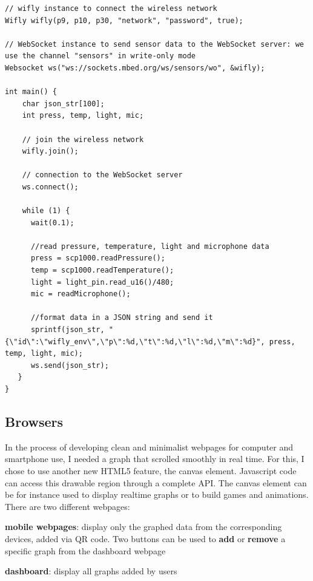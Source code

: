\documentclass[pdftex,10pt,a4paper]{report}
\newenvironment{packed_item}{
\begin{itemize}
  \setlength{\itemsep}{1pt}
  \setlength{\parskip}{0pt}
  \setlength{\parsep}{0pt}
}{\end{itemize}}
\begin{document}
\begin{center}
\begin{lstlisting}[label=Streaming data code example,caption=Streaming data code example]
// wifly instance to connect the wireless network
Wifly wifly(p9, p10, p30, "network", "password", true);

// WebSocket instance to send sensor data to the WebSocket server: we use the channel "sensors" in write-only mode
Websocket ws("ws://sockets.mbed.org/ws/sensors/wo", &wifly);

int main() {
    char json_str[100];
    int press, temp, light, mic;
    
    // join the wireless network
    wifly.join();
    		
    // connection to the WebSocket server
    ws.connect();
    		
    while (1) {
      wait(0.1);

      //read pressure, temperature, light and microphone data
      press = scp1000.readPressure();
      temp = scp1000.readTemperature();
      light = light_pin.read_u16()/480;
      mic = readMicrophone();

      //format data in a JSON string and send it
      sprintf(json_str, "{\"id\":\"wifly_env\",\"p\":%d,\"t\":%d,\"l\":%d,\"m\":%d}", press, temp, light, mic);
      ws.send(json_str);
   }
}
\end{lstlisting}
\end{center}



\subsection{Browsers}
In the process of developing clean and minimalist webpages for computer and smartphone use, I needed a graph that scrolled smoothly in real time. For this, I chose to use another new HTML5 feature, the canvas element. Javascript code can access this drawable region through a complete API. The canvas element can be for instance used to display realtime graphs or to build games and animations.
\\


There are two different webpages:
\begin{packed_item}
	\item \textbf{mobile webpages}: display only the graphed data from the corresponding devices, added via QR code. Two buttons can be used to \textbf{add} or \textbf{remove} a specific graph from the dashboard webpage
	\item \textbf{dashboard}: display all graphs added by users
\end{packed_item}
\end{document}
